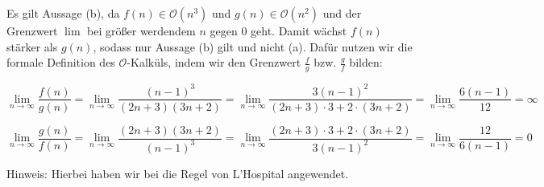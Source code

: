 \documentclass{bschlangaul-aufgabe}
\begin{document}
\begin{bAntwort}
Es gilt Aussage (b), da $f(n) \in \mathcal{O}(n^3)$ und $g(n) \in
\mathcal{O}(n^2)$ und der Grenzwert $\lim$ bei größer werdendem $n$
gegen $0$ geht. Damit wächst $f(n)$ stärker als $g(n)$, sodass nur
Aussage (b) gilt und nicht (a). Dafür nutzen wir die formale Definition
des $\mathcal{O}$-Kalküls, indem wir den Grenzwert $\frac{f}{g}$ bzw.
$\frac{g}{f}$ bilden:

{
\footnotesize
\begin{displaymath}
\lim_{n \to \infty}
\frac{f(n)}
{g(n)}
=
\lim_{n \to \infty}
\frac{(n - 1)^3}
{(2n + 3)(3n + 2)}
=
\lim_{n \to \infty}
\frac{3(n - 1)^2}
{(2n + 3) \cdot 3 + 2 \cdot (3n + 2)}
=
\lim_{n \to \infty}
\frac{6(n - 1)}
{12}
=
\infty
\end{displaymath}

\begin{displaymath}
\lim_{n \to \infty}
\frac{g(n)}
{f(n)}
=
\lim_{n \to \infty}
\frac{(2n + 3)(3n + 2)}
{(n - 1)^3}
=
\lim_{n \to \infty}
\frac{(2n + 3) \cdot 3 + 2 \cdot (3n + 2)}
{3(n - 1)^2}
=
\lim_{n \to \infty}
\frac{12}
{6(n - 1)}
=
0
\end{displaymath}
}
Hinweis: Hierbei haben wir bei die Regel von L’Hospital angewendet.
\end{bAntwort}
\end{document}
